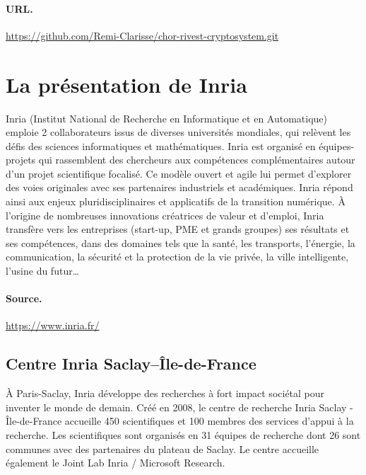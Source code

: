 \documentclass[a4paper, titlepage, 11pt]{article}
\theoremstyle{definition}
\theoremstyle{remark}
\begin{document}
\paragraph{URL.}\url{https://github.com/Remi-Clarisse/chor-rivest-cryptosystem.git}

\setcounter{tocdepth}{1}
\tableofcontents

\newpage

\section{La présentation de Inria}\label{sec:presInria}

Inria (Institut National de Recherche en Informatique et en Automatique) emploie 2 collaborateurs issus de diverses universités mondiales, qui relèvent les défis des sciences informatiques et mathématiques. Inria est organisé en \og{}équipes-projets\fg{} qui rassemblent des chercheurs aux compétences complémentaires autour d’un projet scientifique focalisé. Ce modèle ouvert et agile lui permet d’explorer des voies originales avec ses partenaires industriels et académiques. Inria répond ainsi aux enjeux pluridisciplinaires et applicatifs de la transition numérique. À l'origine de nombreuses innovations créatrices de valeur et d'emploi, Inria transfère vers les entreprises (start-up, PME et grands groupes) ses résultats et ses compétences, dans des domaines tels que la santé, les transports, l'énergie, la communication, la sécurité et la protection de la vie privée, la ville intelligente, l’usine du futur\dots

\paragraph{Source.} \url{https://www.inria.fr/}

\subsection{Centre Inria Saclay--Île-de-France}

À Paris-Saclay, Inria développe des recherches à fort impact sociétal pour inventer le monde de demain. Créé en 2008, le centre de recherche Inria Saclay - Île-de-France accueille 450 scientifiques et 100 membres des services d’appui à la recherche. Les scientifiques sont organisés en 31 équipes de recherche dont 26 sont communes avec des partenaires du plateau de Saclay. Le centre accueille également le Joint Lab Inria / Microsoft Research.
\end{document}
